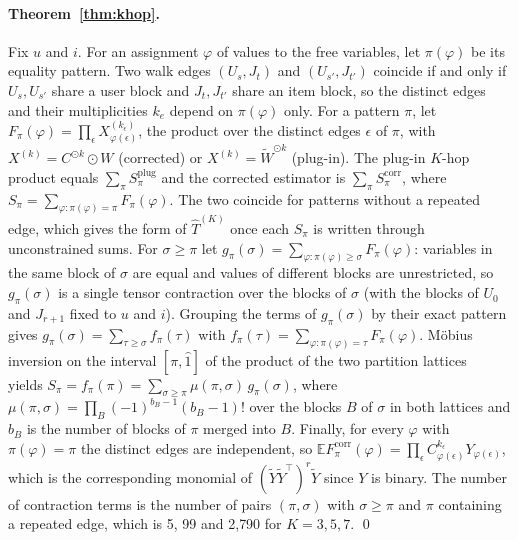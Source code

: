 \documentclass[preprint,review,12pt,authoryear]{elsarticle}
\theoremstyle{definition}
\newcommand{\E}{\mathbb{E}}
\newcommand{\tW}{\tilde W}
\newcommand{\tY}{\tilde Y}
\begin{document}
\paragraph{Theorem~\ref{thm:khop}.}
Fix $u$ and $i$. For an assignment $\varphi$ of values to the free variables, let
$\pi(\varphi)$ be its equality pattern. Two walk edges $(U_s,J_t)$ and
$(U_{s'},J_{t'})$ coincide if and only if $U_s,U_{s'}$ share a user block and
$J_t,J_{t'}$ share an item block, so the distinct edges and their
multiplicities $k_e$ depend on $\pi(\varphi)$ only. For a pattern $\pi$, let
$F_\pi(\varphi)=\prod_\epsilon X^{(k_\epsilon)}_{\varphi(\epsilon)}$, the product over the
distinct edges $\epsilon$ of $\pi$, with $X^{(k)}=C^{\odot k}\odot W$ (corrected) or
$X^{(k)}=\tW^{\odot k}$ (plug-in). The plug-in $K$-hop product equals
$\sum_\pi S^{\mathrm{plug}}_\pi$ and the corrected estimator is
$\sum_\pi S^{\mathrm{corr}}_\pi$, where $S_\pi=\sum_{\varphi:\pi(\varphi)=\pi}F_\pi(\varphi)$. The two
coincide for patterns without a repeated edge, which gives the form of
$\hat T^{(K)}$ once each $S_\pi$ is written through unconstrained sums. For
$\sigma\ge\pi$ let $g_\pi(\sigma)=\sum_{\varphi:\pi(\varphi)\ge\sigma}F_\pi(\varphi)$: variables in the
same block of $\sigma$ are equal and values of different blocks are unrestricted,
so $g_\pi(\sigma)$ is a single tensor contraction over the blocks of $\sigma$ (with
the blocks of $U_0$ and $J_{r+1}$ fixed to $u$ and $i$). Grouping the terms of
$g_\pi(\sigma)$ by their exact pattern gives $g_\pi(\sigma)=\sum_{\tau\ge\sigma}f_\pi(\tau)$ with
$f_\pi(\tau)=\sum_{\varphi:\pi(\varphi)=\tau}F_\pi(\varphi)$. Möbius inversion on the interval
$[\pi,\hat1]$ of the product of the two partition lattices~\citep{rota1964} yields
$S_\pi=f_\pi(\pi)=\sum_{\sigma\ge\pi}\mu(\pi,\sigma)\,g_\pi(\sigma)$, where
$\mu(\pi,\sigma)=\prod_{B}(-1)^{b_B-1}(b_B-1)!$ over the blocks $B$ of $\sigma$ in both
lattices and $b_B$ is the number of blocks of $\pi$ merged into $B$. Finally, for
every $\varphi$ with $\pi(\varphi)=\pi$ the distinct edges are independent, so
$\E F^{\mathrm{corr}}_\pi(\varphi)=\prod_\epsilon C_{\varphi(\epsilon)}^{k_\epsilon}Y_{\varphi(\epsilon)}$, which is the
corresponding monomial of $(\tY\tY^\top)^r\tY$ since $Y$ is binary. The number of
contraction terms is the number of pairs $(\pi,\sigma)$ with $\sigma\ge\pi$ and $\pi$
containing a repeated edge, which is 5, 99 and 2{,}790 for $K=3,5,7$. \qed
\end{document}
